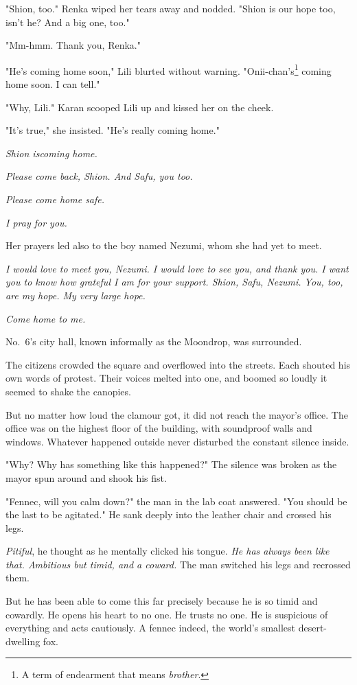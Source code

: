 "Shion, too." Renka wiped her tears away and nodded. "Shion is our hope
too, isn't he? And a big one, too."

"Mm-hmm. Thank you, Renka."

"He's coming home soon," Lili blurted without warning. "Onii-chan's\footnote{A term of endearment that means \emph{brother}.}
coming home soon. I can tell."

"Why, Lili." Karan scooped Lili up and kissed her on the cheek.

"It's true," she insisted. "He's really coming home."

\emph{Shion is\el coming home.}

\emph{Please come back, Shion. And Safu, you too.}

\emph{Please come home safe.}

\emph{I pray for you.}

Her prayers led also to the boy named Nezumi, whom she had yet to meet.

\emph{I would love to meet you, Nezumi. I would love to see you, and thank
you. I want you to know how grateful I am for your support. Shion, Safu,
Nezumi. You, too, are my hope. My very large hope.}

\emph{Come home to me.}

\mybreak

No.~6's city hall, known informally as the Moondrop, was surrounded.

The citizens crowded the square and overflowed into the streets. Each
shouted his own words of protest. Their voices melted into one, and
boomed so loudly it seemed to shake the canopies.

But no matter how loud the clamour got, it did not reach the mayor's
office. The office was on the highest floor of the building, with
soundproof walls and windows. Whatever happened outside never disturbed
the constant silence inside.

"Why? Why has something like this happened?" The silence was broken as
the mayor spun around and shook his fist.

"Fennec, will you calm down?" the man in the lab coat answered. "You
should be the last to be agitated." He sank deeply into the leather
chair and crossed his legs.

\emph{Pitiful}, he thought as he mentally clicked his tongue. \emph{He has always
been like that. Ambitious but timid, and a coward.} The man switched his
legs and recrossed them.

But he has been able to come this far precisely because he is so timid
and cowardly. He opens his heart to no one. He trusts no one. He is
suspicious of everything and acts cautiously. A fennec indeed, the
world's smallest desert-dwelling fox.

